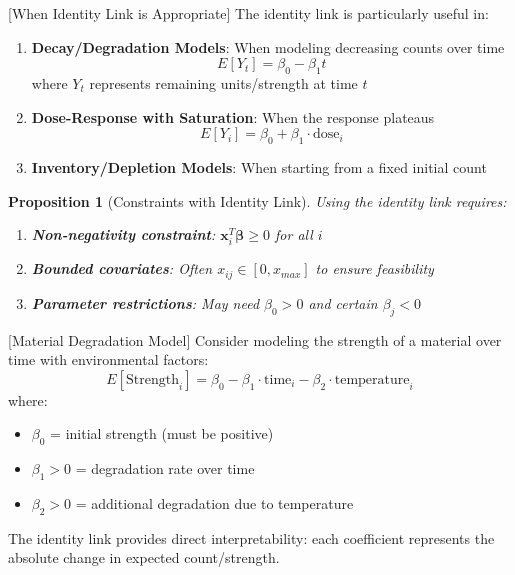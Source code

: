 \documentclass{article}
\newtheorem{proposition}{Proposition}
\begin{document}
[When Identity Link is Appropriate]
The identity link is particularly useful in:
\begin{enumerate}
    \item \textbf{Decay/Degradation Models}: When modeling decreasing counts over time
    \begin{equation}
    E[Y_t] = \beta_0 - \beta_1 t
    \end{equation}
    where $Y_t$ represents remaining units/strength at time $t$
    
    \item \textbf{Dose-Response with Saturation}: When the response plateaus
    \begin{equation}
    E[Y_i] = \beta_0 + \beta_1 \cdot \text{dose}_i
    \end{equation}
    
    \item \textbf{Inventory/Depletion Models}: When starting from a fixed initial count
\end{enumerate}


\begin{proposition}[Constraints with Identity Link]
Using the identity link requires:
\begin{enumerate}
    \item \textbf{Non-negativity constraint}: $\mathbf{x}_i^T\boldsymbol{\beta} \geq 0$ for all $i$
    \item \textbf{Bounded covariates}: Often $x_{ij} \in [0, x_{max}]$ to ensure feasibility
    \item \textbf{Parameter restrictions}: May need $\beta_0 > 0$ and certain $\beta_j < 0$
\end{enumerate}
\end{proposition}

[Material Degradation Model]
Consider modeling the strength of a material over time with environmental factors:
\begin{equation}
E[\text{Strength}_i] = \beta_0 - \beta_1 \cdot \text{time}_i - \beta_2 \cdot \text{temperature}_i
\end{equation}
where:
\begin{itemize}
    \item $\beta_0$ = initial strength (must be positive)
    \item $\beta_1 > 0$ = degradation rate over time
    \item $\beta_2 > 0$ = additional degradation due to temperature
\end{itemize}
The identity link provides direct interpretability: each coefficient represents the absolute change in expected count/strength.
\end{document}

